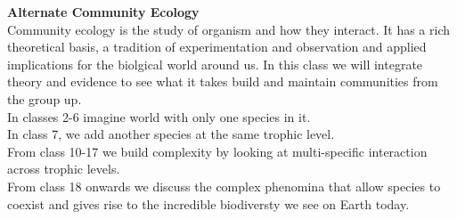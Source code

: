 \documentclass{article}
\begin{document}

\textbf{Alternate Community Ecology}\\
Community ecology is the study of organism and how they interact. It has a rich theoretical basis, a tradition of experimentation and observation and applied implications for the biolgical world around us. In this class we will integrate theory and evidence to see what it takes build and maintain communities from the group up. \\
In classes 2-6 imagine world with only one species in it.\\
In class 7, we add another species at the same trophic level.\\
From class 10-17 we build complexity by looking at multi-specific interaction across trophic levels.\\
From class 18 onwards we discuss the complex phenomina that allow species to coexist and gives rise to the incredible biodiversty we see on Earth today.
\end{document}

